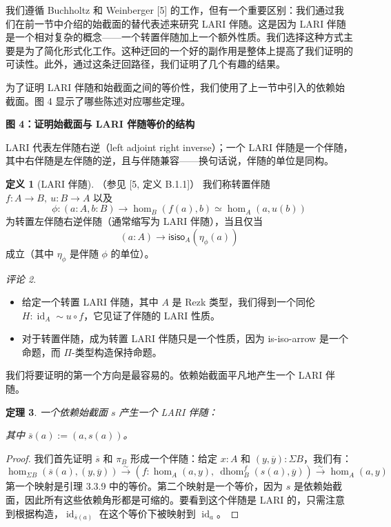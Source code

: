 \documentclass{ctexrep}
\theoremstyle{plain}
\newtheorem{theorem}{定理}[section]
\theoremstyle{definition}
\newtheorem{definition}[theorem]{定义}
\theoremstyle{remark}
\newtheorem{remark}[theorem]{评论}
\theoremstyle{definition}
\theoremstyle{definition}
\theoremstyle{definition}
\newcommand{\coloneqq}{\mathrel{:=}}
\newcommand{\id}{\operatorname{id}}
\newcommand{\dhom}{\operatorname{dhom}}
\newcommand{\isiso}{\mathsf{isiso}}
\begin{document}
我们遵循 Buchholtz 和 Weinberger [5] 的工作，但有一个重要区别：我们通过我们在前一节中介绍的始截面的替代表述来研究 LARI 伴随。这是因为 LARI 伴随是一个相对复杂的概念——一个转置伴随加上一个额外性质。我们选择这种方式主要是为了简化形式化工作。这种迂回的一个好的副作用是整体上提高了我们证明的可读性。此外，通过这条迂回路径，我们证明了几个有趣的结果。

为了证明 LARI 伴随和始截面之间的等价性，我们使用了上一节中引入的依赖始截面。图 4 显示了哪些陈述对应哪些定理。

\begin{center}
\textbf{图 4：证明始截面与 LARI 伴随等价的结构}
\end{center}

LARI 代表左伴随右逆（left adjoint right inverse）；一个 LARI 伴随是一个伴随，其中右伴随是左伴随的逆，且与伴随兼容——换句话说，伴随的单位是同构。

\begin{definition}[LARI 伴随]（参见 [5, 定义 B.1.1]）
我们称转置伴随 $f:A\to B,\ u:B\to A$ 以及
\[
\phi:(a:A,b:B) \to \hom_B(f(a),b) \simeq \hom_A(a,u(b))
\]
为转置左伴随右逆伴随（通常缩写为 LARI 伴随），当且仅当
\[
(a:A) \to \isiso_A(\eta_\phi(a))
\]
成立（其中 $\eta_\phi$ 是伴随 $\phi$ 的单位）。
\end{definition}

\begin{remark}
\begin{itemize}
\item 给定一个转置 LARI 伴随，其中 $A$ 是 Rezk 类型，我们得到一个同伦 $H:\id_A \sim u\circ f$，它见证了伴随的 LARI 性质。
\item 对于转置伴随，成为转置 LARI 伴随只是一个性质，因为 is-iso-arrow 是一个命题，而 $\Pi$-类型构造保持命题。
\end{itemize}
\end{remark}

我们将要证明的第一个方向是最容易的。依赖始截面平凡地产生一个 LARI 伴随。

\begin{theorem}
一个依赖始截面 $s$ 产生一个 LARI 伴随：

其中 $\overline{s}(a) \coloneqq (a,s(a))$。
\end{theorem}

\begin{proof}
我们首先证明 $\overline{s}$ 和 $\pi_B$ 形成一个伴随：给定 $x:A$ 和 $(y,\overline{y}):\Sigma B$，我们有：
\[
\hom_{\Sigma B}(\overline{s}(a), (y,\overline{y})) \xrightarrow{\sim} \left(f:\hom_A(a,y),\ \dhom_B^f(s(a),\overline{y})\right) \xrightarrow{\sim} \hom_A(a,y)
\]
第一个映射是引理 3.3.9 中的等价。第二个映射是一个等价，因为 $s$ 是依赖始截面，因此所有这些依赖角形都是可缩的。要看到这个伴随是 LARI 的，只需注意到根据构造，$\id_{\overline{s}(a)}$ 在这个等价下被映射到 $\id_a$。
\end{proof}
\end{document}
